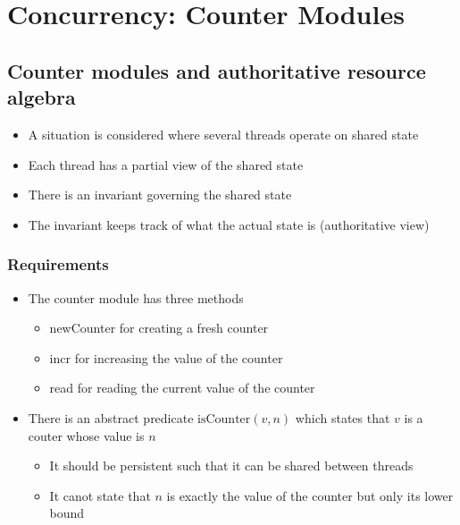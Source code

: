 \section{Concurrency: Counter Modules}

   
\subsection{Counter modules and authoritative resource algebra}
\begin{itemize}
	\item A situation is considered where several threads operate on shared state
  \item Each thread has a partial view of the shared state
  \item There is an invariant governing the shared state
  \item The invariant keeps track of what the actual state is (authoritative view)
\end{itemize}

\subsubsection{Requirements}
\begin{itemize}
  \item The counter module has three methods
  \begin{itemize}
  	\item newCounter for creating a fresh counter 
    \item incr for increasing the value of the counter
    \item read for reading the current value of the counter
  \end{itemize}
  \item There is an abstract predicate $\text{isCounter}(v,n)$ which states that $v$ is a couter whose value is $n$
  \begin{itemize}
  	\item It should be persistent such that it can be shared between threads 
    \item It canot state that $n$ is exactly the value of the counter but only its lower bound
  \end{itemize} 
\end{itemize}

